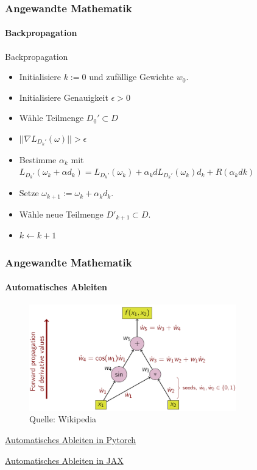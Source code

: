 \documentclass{beamer}
\begin{document}
\begin{frame}
    \frametitle{Angewandte Mathematik}
\framesubtitle{Backpropagation}
    \begin{block}{Backpropagation}
\begin{itemize}
\item  Initialisiere $k:=0$ und zufällige Gewichte $w_0$.
\item \pause Initialisiere Genauigkeit $\epsilon > 0$
\item \pause Wähle Teilmenge $D_0' \subset D$
\item \pause   {} {$|| \nabla L_{D_k'}(\omega) || > \epsilon$}  
\item \pause Bestimme $\alpha_k$  mit $ L_{D_k'}(\omega_k + \alpha d_k) =  L_{D_k'}(\omega_k) + \alpha_k d L_{D_k'}(\omega_k)d_k + R( \alpha_k dk)$ 
\item \pause  Setze $\omega_{k+1} := \omega_k  + \alpha_k d_k$. 
\item \pause Wähle neue Teilmenge $D'_{k +1} \subset D$.
\item \pause $k \leftarrow k+1$
\end{itemize}
\end{block}
 \end{frame}


\begin{frame}
    \frametitle{Angewandte Mathematik}
\framesubtitle{Automatisches Ableiten}
\begin{figure}[H]
      \centering
    \includegraphics[width=0.8\textwidth]{images/ad.png}
      \caption{Quelle: Wikipedia}
\end{figure}

\href{https://pytorch.org/tutorials/beginner/blitz/autograd_tutorial.html}{Automatisches Ableiten  in Pytorch}

\href{https://jax.readthedocs.io/en/latest/notebooks/quickstart.html}{Automatisches Ableiten  in JAX}

 \end{frame}
\end{document}

